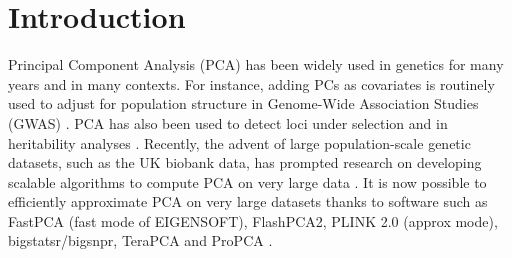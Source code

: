 \documentclass{bioinfo}
\begin{document}


\section{Introduction}

Principal Component Analysis (PCA) has been widely used in genetics for many years and in many contexts. For instance, adding PCs as covariates is routinely used to adjust for population structure in Genome-Wide Association Studies (GWAS) \cite[]{price2006principal,novembre2008interpreting}. PCA has also been used to detect loci under selection \cite[]{galinsky2016fast,luu2017pcadapt,prive2020performing} and in heritability analyses \cite[]{yang2010common,loh2015contrasting}.
Recently, the advent of large population-scale genetic datasets, such as the UK biobank data, has prompted research on developing scalable algorithms to compute PCA on very large data \cite[]{bycroft2017genome}.
It is now possible to efficiently approximate PCA on very large datasets thanks to software such as FastPCA (fast mode of EIGENSOFT), FlashPCA2, PLINK 2.0 (approx mode), bigstatsr/bigsnpr, TeraPCA and ProPCA \cite[]{galinsky2016fast,abraham2017flashpca2,chang2015second,prive2017efficient,bose2019terapca,agrawal2019scalable}.
\end{document}
